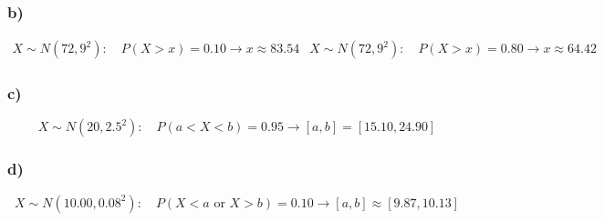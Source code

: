 \subsubsection*{b)}
\[
\begin{array}{ll}
	X\sim N(72,9^2):\quad P(X>x)=0.10 \longrightarrow x\approx 83.54
	&
	X\sim N(72,9^2):\quad P(X>x)=0.80 \longrightarrow x\approx 64.42
\end{array}
\]

\subsubsection*{c)}
\[
X\sim N(20,2.5^2):\quad P(a<X<b)=0.95 \longrightarrow [a,b]=[15.10,24.90]
\]

\subsubsection*{d)}
\[
X\sim N(10.00,0.08^2):\quad P(X<a\text{ or }X>b)=0.10 \longrightarrow [a,b]\approx[9.87,10.13]
\]



